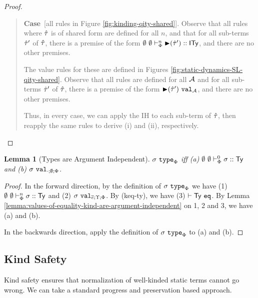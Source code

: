 \documentclass[12pt]{article}
\newtheorem{lemma}{Lemma}
\newcommand{\pfcase}[1]{\textbf{Case}~#1. }
\begin{document}
\begin{proof}
\begin{quote}
\pfcase{[all rules in Figure \ref{fig:kinding-qity-shared}]} Observe that all rules where $\hat{\tau}$ is of shared form are defined for all $n$, and that for all sub-terms $\hat{\tau}'$ of $\hat{\tau}$, there is a premise of the form $\emptyset~\emptyset \vdash_{\Phi}^{n} {\blacktriangleright}(\hat{\tau}') :: {\sf ITy}$, and there are no other premises.

The value rules for these are defined in Figures \ref{fig:static-dynamics-SL-qity-shared}. Observe that all rules are defined for all $\mathcal{A}$ and for all sub-terms $\hat{\tau}'$ of $\hat{\tau}$, there is a premise of the form ${\blacktriangleright}(\hat{\tau}')~\mathtt{val}_{\mathcal{A}}$, and there are no other premises.

Thus, in every case, we can apply the IH to each sub-term of $\hat{\tau}$, then reapply the same rules to derive (i) and (ii), respectively.
\end{quote}
\end{proof}

\begin{lemma}[Types are Argument Independent]
\label{lemma:types-are-argument-independent}
$\sigma~\mathtt{type}_{\Phi}$ iff (a) $\emptyset~\emptyset \vdash_{\Phi}^{0} \sigma :: {\sf Ty}$ and (b) $\sigma~\mathtt{val}_{\cdot;\emptyset;\Phi}$.
\end{lemma}
\begin{proof}
In the forward direction, by the definition of $\sigma~\mathtt{type}_{\Phi}$ we have (1) $\emptyset~\emptyset \vdash_{\Phi}^{n} \sigma :: {\sf Ty}$ and (2) $\sigma~\mathtt{val}_{\overline{e};\Upsilon;\Phi}$. By (keq-ty), we have (3) $\vdash {\sf Ty}~\mathtt{eq}$. By Lemma \ref{lemma:values-of-equality-kind-are-argument-independent} on 1, 2 and 3, we have (a) and (b).

In the backwards direction, apply the definition of $\sigma~\mathtt{type}_{\Phi}$ to (a) and (b).
\end{proof}

\subsection{Kind Safety}
Kind safety ensures that normalization of well-kinded static terms cannot go wrong. We can take a standard progress and preservation based approach. 
\end{document}
